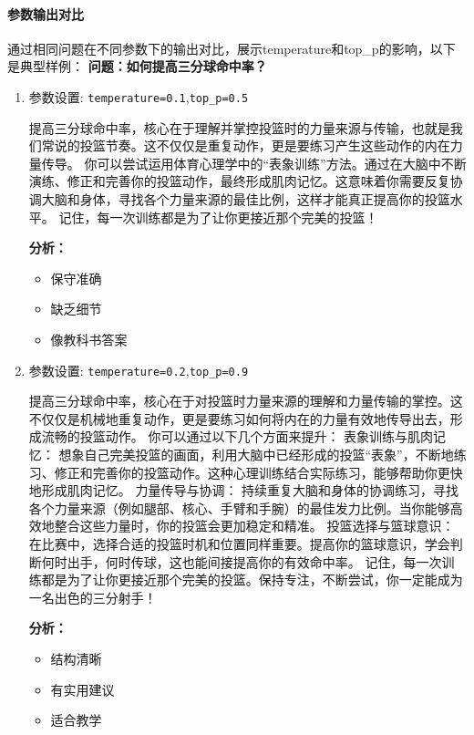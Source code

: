\documentclass{article}
\theoremstyle{plain}
\theoremstyle{definition}
\theoremstyle{remark}
\begin{document}
\paragraph{参数输出对比}
通过相同问题在不同参数下的输出对比，展示temperature和top\_p的影响，以下是典型样例：
\newline
\textbf{问题：如何提高三分球命中率？}
\begin{enumerate}
  \item
  参数设置: \lstinline{temperature=0.1},\lstinline{top_p=0.5}
  \begin{techbox}
    提高三分球命中率，核心在于理解并掌控投篮时的力量来源与传输，也就是我们常说的投篮节奏。这不仅仅是重复动作，更是要练习产生这些动作的内在力量传导。
  你可以尝试运用体育心理学中的“表象训练”方法。通过在大脑中不断演练、修正和完善你的投篮动作，最终形成肌肉记忆。这意味着你需要反复协调大脑和身体，寻找各个力量来源的最佳比例，这样才能真正提高你的投篮水平。
  记住，每一次训练都是为了让你更接近那个完美的投篮！
  \end{techbox}
  \textbf{分析：}
  \begin{itemize}
    \item 保守准确
    \item 缺乏细节
    \item 像教科书答案
  \end{itemize}

  \item
  参数设置: \lstinline{temperature=0.2},\lstinline{top_p=0.9}
  \begin{techbox}
      提高三分球命中率，核心在于对投篮时力量来源的理解和力量传输的掌控。这不仅仅是机械地重复动作，更是要练习如何将内在的力量有效地传导出去，形成流畅的投篮动作。
  你可以通过以下几个方面来提升：
  表象训练与肌肉记忆： 想象自己完美投篮的画面，利用大脑中已经形成的投篮“表象”，不断地练习、修正和完善你的投篮动作。这种心理训练结合实际练习，能够帮助你更快地形成肌肉记忆。
  力量传导与协调： 持续重复大脑和身体的协调练习，寻找各个力量来源（例如腿部、核心、手臂和手腕）的最佳发力比例。当你能够高效地整合这些力量时，你的投篮会更加稳定和精准。
  投篮选择与篮球意识： 在比赛中，选择合适的投篮时机和位置同样重要。提高你的篮球意识，学会判断何时出手，何时传球，这也能间接提高你的有效命中率。
  记住，每一次训练都是为了让你更接近那个完美的投篮。保持专注，不断尝试，你一定能成为一名出色的三分射手！
  \end{techbox}
  \textbf{分析：}
  \begin{itemize}
    \item 结构清晰
    \item 有实用建议
    \item 适合教学
  \end{itemize}


\end{enumerate}
\end{document}
